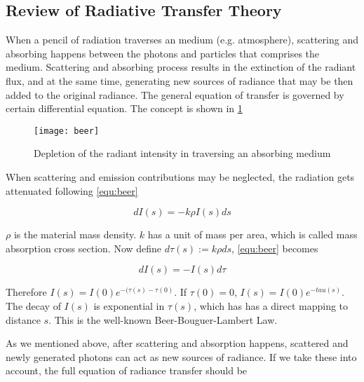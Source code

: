 \begin{appendices}
\section{Review of Radiative Transfer Theory}

\setcounter{figure}{0} \renewcommand{\thefigure}{A.\arabic{figure}}
\setcounter{equation}{0} \renewcommand{\theequation}{A.\arabic{equation}}

When a pencil of radiation traverses an medium (e.g. atmosphere), scattering and absorbing happens between the photons and particles that comprises the medium. Scattering and absorbing process results in the extinction of the radiant flux, and at the same time, generating new sources of radiance that may be then added to the original radiance. The general equation of transfer is governed by certain differential equation. The concept is shown in \ref{fig:beer}

\begin{figure}[h!]
    \centering
    \texttt{[image: beer]}
    \caption{Depletion of the radiant intensity in traversing an absorbing medium}
    \label{fig:beer}
\end{figure}

When scattering and emission contributions may be neglected, the radiation gets attenuated following \eqref{equ:beer}

\begin{equation}
    dI(s) = -k\rho I(s) ds
    \label{equ:beer}
\end{equation}

$\rho$ is the material mass density. $k$ has a unit of mass per area, which is called mass absorption cross section. Now define $d\tau(s) := k\rho ds$, \eqref{equ:beer} becomes

\begin{equation}
    dI(s) = -I(s)d\tau
\end{equation}

Therefore $I(s) = I(0)e^{-(\tau(s) - \tau(0)}$. If $\tau(0)=0$, $I(s) = I(0)e^{-tau(s)}$. The decay of $I(s)$ is exponential in $\tau(s)$, which has has a direct mapping to distance $s$. This is the well-known Beer-Bouguer-Lambert Law.

As we mentioned above, after scattering and absorption happens, scattered and newly generated photons can act as new sources of radiance. If we take these into account, the full equation of radiance transfer should be


\end{appendices}
